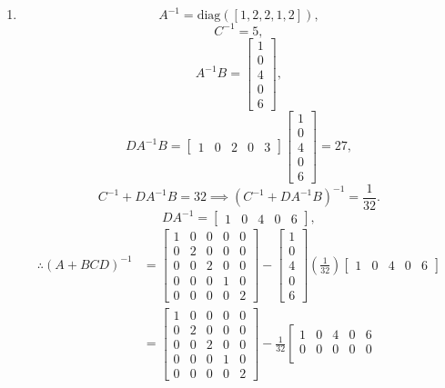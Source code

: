 \documentclass[letterpaper]{article}
\begin{document}
\begin{enumerate}
\item $$A^{-1} = \text{diag}([1, 2, 2, 1, 2]),$$
$$C^{-1} = 5,$$
$$A^{-1}B = \begin{bmatrix} 1\\ 0\\ 4\\ 0\\ 6\end{bmatrix},$$
$$DA^{-1}B = \left[\begin{array}{ccccc} 1 & 0 & 2 & 0 & 3 \end{array}\right] \begin{bmatrix} 1\\ 0\\ 4\\ 0\\ 6\end{bmatrix} = 27,$$
$$C^{-1}+DA^{-1}B = 32 \implies (C^{-1}+DA^{-1}B)^{-1} = \frac{1}{32}.$$
$$DA^{-1} = \left[\begin{array}{ccccc} 1 & 0 & 4 & 0 & 6 \end{array}\right],$$
$$\begin{aligned}\therefore (A+BCD)^{-1} &= \left[\begin{array}{ccccc} 1 & 0 & 0 & 0 & 0 \\
0 & 2 & 0 & 0 & 0 \\
0 & 0 & 2 & 0 & 0 \\
0 & 0 & 0 & 1 & 0 \\
0 & 0 & 0 & 0 & 2 \end{array}\right] - \begin{bmatrix} 1\\ 0\\ 4\\ 0\\ 6\end{bmatrix}(\frac{1}{32})\left[\begin{array}{ccccc} 1 & 0 & 4 & 0 & 6\end{array}\right]\\
&= \left[\begin{array}{ccccc} 1 & 0 & 0 & 0 & 0 \\
0 & 2 & 0 & 0 & 0 \\
0 & 0 & 2 & 0 & 0 \\
0 & 0 & 0 & 1 & 0 \\
0 & 0 & 0 & 0 & 2 \end{array}\right] - \frac{1}{32}\left[\begin{array}{ccccc}
1 & 0 & 4 & 0 & 6 \\
0 & 0 & 0 & 0 & 0 \\

\end{array}
\end{aligned}$$
\end{enumerate}
\end{document}
